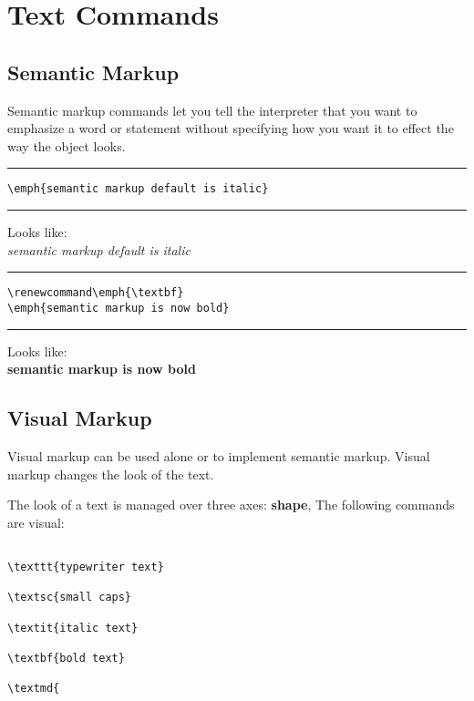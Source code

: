 \documentclass{article}
\begin{document}
\section{Text Commands}

\subsection{Semantic Markup}

Semantic markup commands let you tell the interpreter that you want to emphasize a word or statement without specifying how you want it to effect the way the object looks. 
\vspace{0.25in}
\hrule \vspace{0.25in}

\begin{verbatim}
\emph{semantic markup default is italic} 
\end{verbatim}
\vspace{0.25in}
\hrule \vspace{0.25in}

Looks like: \\
\emph{semantic markup default is italic}
\vspace{0.25in}
\hrule \vspace{0.25in}

\begin{verbatim}
\renewcommand\emph{\textbf}
\emph{semantic markup is now bold}
\end{verbatim}

\vspace{0.25in}
\hrule \vspace{0.25in}

\renewcommand\emph{\textbf}
Looks like: \\
\emph{semantic markup is now bold}
\vspace{0.25in}

\subsection{Visual Markup}

Visual markup can be used alone or to implement semantic markup. 
Visual markup changes the look of the text. 

The look of a text is managed over three axes: \textbf{shape}, 
The following commands are visual:

\begin{verbatim}

\texttt{typewriter text}

\textsc{small caps}

\textit{italic text}

\textbf{bold text}

\textmd{

\end{verbatim}
\end{document}
